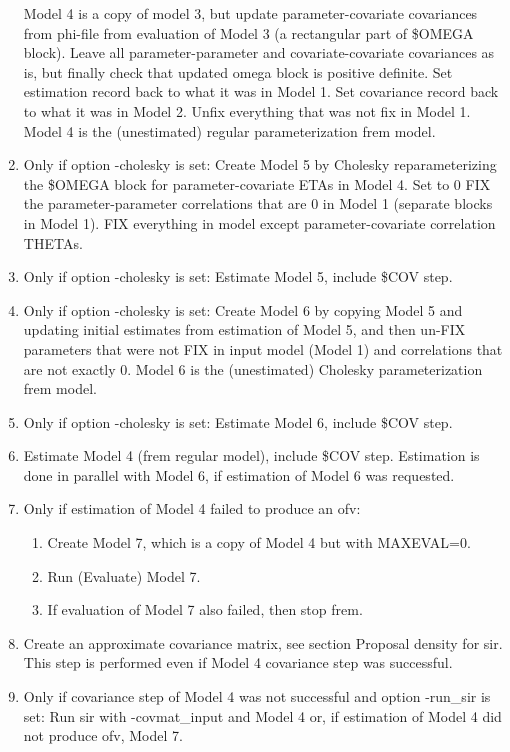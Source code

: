 \begin{enumerate}
Model 4 is a copy of model 3, but update parameter-covariate covariances from phi-file from evaluation of Model 3
(a rectangular part of \$OMEGA block).
Leave all parameter-parameter and covariate-covariate covariances as is, but
finally check that updated omega block is positive definite.
Set estimation record back to what it was in Model 1.
Set covariance record back to what it was in Model 2.
Unfix everything that was not fix in Model 1.
Model 4 is the (unestimated) regular parameterization frem model.
\item
Only if option -cholesky is set: Create Model 5 by
Cholesky reparameterizing the \$OMEGA block
for parameter-covariate ETAs in Model 4.
Set to 0 FIX the parameter-parameter correlations that are 0 in Model 1 (separate blocks in Model 1).
FIX everything in model except parameter-covariate correlation THETAs.
\item Only if option -cholesky is set: Estimate Model 5, include \$COV step.
\item Only if option -cholesky is set: Create Model 6
by copying Model 5 and updating initial estimates from
estimation of Model 5, and then un-FIX parameters that
were not FIX in input model (Model 1) and correlations that are not exactly 0.
Model 6 is the (unestimated) Cholesky parameterization frem model.
\item Only if option -cholesky is set:
Estimate Model 6, include \$COV step.
\item %
Estimate Model 4 (frem regular model), include \$COV step.
Estimation is done in parallel with Model 6, if estimation of Model 6 was requested.
\item Only if estimation of Model 4 failed to produce an ofv:
\begin{enumerate}
\item Create Model 7, which is a copy of Model 4 but with MAXEVAL=0.
\item Run (Evaluate) Model 7.
\item If evaluation of Model 7 also failed, then stop frem.
\end{enumerate}
\item Create an approximate covariance matrix, see section Proposal density for sir.
This step is performed even if Model 4 covariance step was successful.
\item Only if covariance step of Model 4 was not successful and option -run\_sir is set:
Run sir with -covmat\_input and Model 4 or, if estimation of Model 4 did not produce ofv, Model 7.
\end{enumerate}



